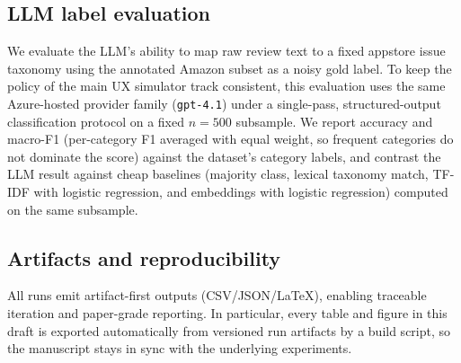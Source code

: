 \subsection{LLM label evaluation}
\label{sec:appstore-eval}
We evaluate the LLM's ability to map raw review text to a fixed appstore issue taxonomy using the annotated Amazon subset as a noisy gold label. To keep the policy of the main UX simulator track consistent, this evaluation uses the same Azure-hosted provider family (\texttt{gpt-4.1}) under a single-pass, structured-output classification protocol on a fixed $n=500$ subsample. We report accuracy and macro-F1 (per-category F1 averaged with equal weight, so frequent categories do not dominate the score) against the dataset's category labels, and contrast the LLM result against cheap baselines (majority class, lexical taxonomy match, TF-IDF with logistic regression, and embeddings with logistic regression) computed on the same subsample.

\subsection{Artifacts and reproducibility}
All runs emit artifact-first outputs (CSV/JSON/LaTeX), enabling traceable iteration and paper-grade reporting.
In particular, every table and figure in this draft is exported automatically from versioned run artifacts by a build script, so the manuscript stays in sync with the underlying experiments.
